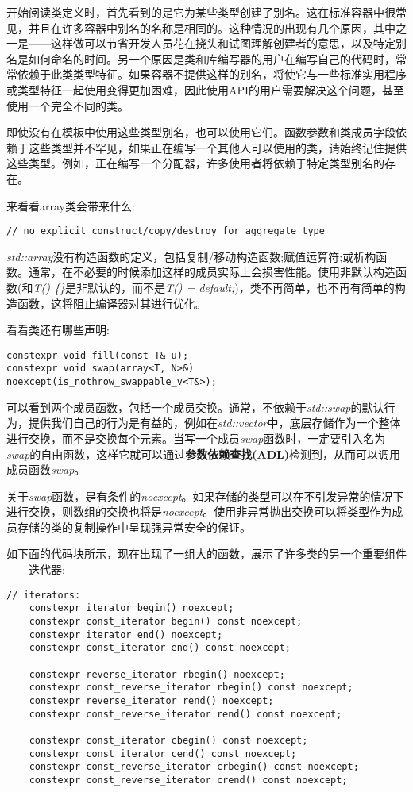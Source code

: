 开始阅读类定义时，首先看到的是它为某些类型创建了别名。这在标准容器中很常见，并且在许多容器中别名的名称是相同的。这种情况的出现有几个原因，其中之一是——这样做可以节省开发人员花在挠头和试图理解创建者的意思，以及特定别名是如何命名的时间。另一个原因是类和库编写器的用户在编写自己的代码时，常常依赖于此类类型特征。如果容器不提供这样的别名，将使它与一些标准实用程序或类型特征一起使用变得更加困难，因此使用API的用户需要解决这个问题，甚至使用一个完全不同的类。

即使没有在模板中使用这些类型别名，也可以使用它们。函数参数和类成员字段依赖于这些类型并不罕见，如果正在编写一个其他人可以使用的类，请始终记住提供这些类型。例如，正在编写一个分配器，许多使用者将依赖于特定类型别名的存在。

来看看array类会带来什么:

\begin{lstlisting}[style=styleCXX]
// no explicit construct/copy/destroy for aggregate type
\end{lstlisting}

\textit{std::array}没有构造函数的定义，包括复制/移动构造函数;赋值运算符;或析构函数。通常，在不必要的时候添加这样的成员实际上会损害性能。使用非默认构造函数(和\textit{T() \{\}}是非默认的，而不是\textit{T() = default;})，类不再简单，也不再有简单的构造函数，这将阻止编译器对其进行优化。

看看类还有哪些声明:

\begin{lstlisting}[style=styleCXX]
constexpr void fill(const T& u);
constexpr void swap(array<T, N>&) noexcept(is_nothrow_swappable_v<T&>);
\end{lstlisting}

可以看到两个成员函数，包括一个成员交换。通常，不依赖于\textit{std::swap}的默认行为，提供我们自己的行为是有益的，例如在\textit{std::vector}中，底层存储作为一个整体进行交换，而不是交换每个元素。当写一个成员\textit{swap}函数时，一定要引入名为\textit{swap}的自由函数，这样它就可以通过\textbf{参数依赖查找(ADL)}检测到，从而可以调用成员函数\textit{swap}。

关于\textit{swap}函数，是有条件的\textit{noexcept}。如果存储的类型可以在不引发异常的情况下进行交换，则数组的交换也将是\textit{noexcept}。使用非异常抛出交换可以将类型作为成员存储的类的复制操作中呈现强异常安全的保证。

如下面的代码块所示，现在出现了一组大的函数，展示了许多类的另一个重要组件——迭代器:

\begin{lstlisting}[style=styleCXX]
	 // iterators:
	constexpr iterator begin() noexcept;
	constexpr const_iterator begin() const noexcept;
	constexpr iterator end() noexcept;
	constexpr const_iterator end() const noexcept;
	
	constexpr reverse_iterator rbegin() noexcept;
	constexpr const_reverse_iterator rbegin() const noexcept;
	constexpr reverse_iterator rend() noexcept;
	constexpr const_reverse_iterator rend() const noexcept;
	
	constexpr const_iterator cbegin() const noexcept;
	constexpr const_iterator cend() const noexcept;
	constexpr const_reverse_iterator crbegin() const noexcept;
	constexpr const_reverse_iterator crend() const noexcept;
\end{lstlisting}

